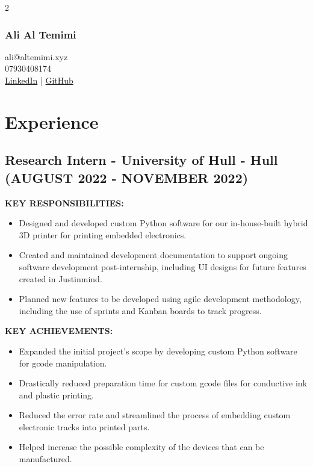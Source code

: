 \documentclass{article}
\begin{document}
\begin{multicols}{2}
    \subsubsection{Ali Al Temimi}
    \columnbreak
    \Large\raggedleft ali@altemimi.xyz \\ 07930408174 \\ \href{https://www.linkedin.com/in/ali-al-temimi-8995b4196/}{LinkedIn} | \href{https://github.com/ali-altemimi}{GitHub}

    \noindent
\end{multicols}

\section{Experience}
\subsection{Research Intern - \textnormal{University of Hull - Hull} \footnotesize{(AUGUST 2022 - NOVEMBER 2022)}}
\begin{minipage}[t]{1\textwidth}
    \footnotesize{\textbf{KEY RESPONSIBILITIES:}}
    \normalsize{}
    \begin{itemize}[leftmargin=*]
        \item Designed and developed custom Python software for our in-house-built hybrid 3D printer for printing embedded electronics. 
        \item Created and maintained development documentation to support ongoing software development post-internship, including UI designs for future features created in Justinmind.
        \item Planned new features to be developed using agile development methodology, including the use of sprints and Kanban boards to track progress.
    \end{itemize}
\end{minipage}
\begin{minipage}[t]{1\textwidth}
    \vspace{1em}
    \footnotesize{\textbf{KEY ACHIEVEMENTS:}}
    \normalsize{}
    \begin{itemize}[leftmargin=*]
        \item Expanded the initial project’s scope by developing custom Python software for gcode manipulation.
        \item Drastically reduced preparation time for custom gcode files for conductive ink and plastic printing.
        \item Reduced the error rate and streamlined the process of embedding custom electronic tracks into printed parts. 
        \item Helped increase the possible complexity of the devices that can be manufactured.
    \end{itemize}
\end{minipage}
\end{document}
